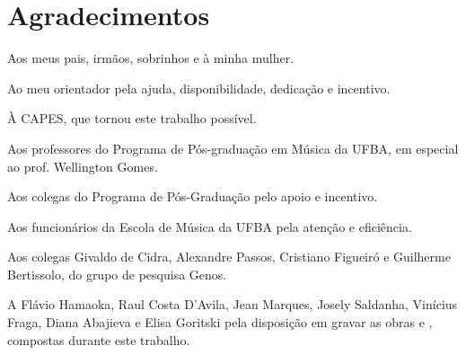 \chapter*{Agradecimentos}
\label{cha:agradecimentos}

Aos meus pais, irmãos, sobrinhos e à minha mulher.

Ao meu orientador pela ajuda, disponibilidade, dedicação e incentivo.

À CAPES, que tornou este trabalho possível.

Aos professores do Programa de Pós-graduação em Música da UFBA, em
especial ao prof. Wellington Gomes.

Aos colegas do Programa de Pós-Graduação pelo apoio e incentivo.

Aos funcionários da Escola de Música da UFBA pela atenção e
eficiência.

Aos colegas Givaldo de Cidra, Alexandre Passos, Cristiano Figueiró e
Guilherme Bertissolo, do grupo de pesquisa Genos.

A Flávio Hamaoka, Raul Costa D'Avila, Jean Marques, Josely Saldanha,
Vinícius Fraga, Diana Abajieva e Elisa Goritski pela disposição em
gravar as obras  e \obra{}, compostas
durante este trabalho.
